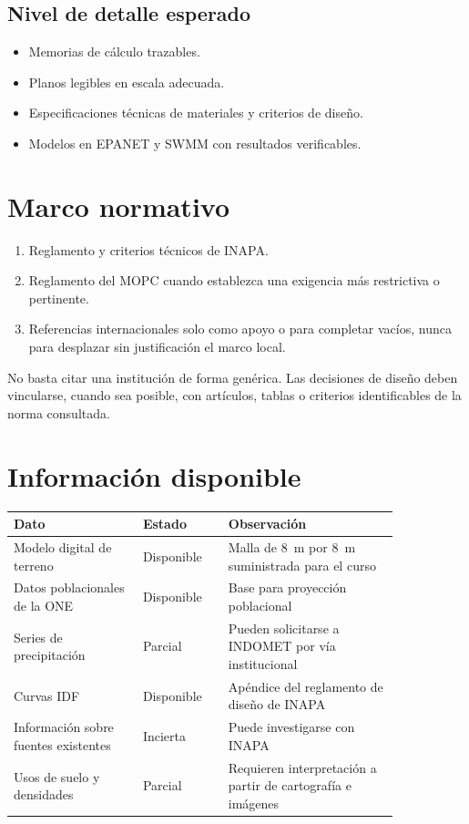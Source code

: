 \documentclass[11pt]{scrartcl}
\begin{document}
\subsection{Nivel de detalle esperado}
\begin{itemize}
  \item Memorias de cálculo trazables.
  \item Planos legibles en escala adecuada.
  \item Especificaciones técnicas de materiales y criterios de diseño.
  \item Modelos en EPANET y SWMM con resultados verificables.
\end{itemize}

\section{Marco normativo}
\begin{enumerate}
  \item Reglamento y criterios técnicos de INAPA.
  \item Reglamento del MOPC cuando establezca una exigencia más
    restrictiva o pertinente.
  \item Referencias internacionales solo como apoyo o para completar
    vacíos, nunca para desplazar sin justificación el marco local.
\end{enumerate}

\begin{icvwarning}[Atención]
No basta citar una institución de forma genérica. Las decisiones de
diseño deben vincularse, cuando sea posible, con artículos, tablas o
criterios identificables de la norma consultada.
\end{icvwarning}

\section{Información disponible}
\begin{center}
\begin{tabular}{p{0.29\linewidth} p{0.18\linewidth} p{0.37\linewidth}}
  \toprule
  \textbf{Dato} & \textbf{Estado} & \textbf{Observación} \\
  \midrule
  Modelo digital de terreno & Disponible & Malla de \qty{8}{\meter}
    por \qty{8}{\meter} suministrada para el curso \\
  Datos poblacionales de la ONE & Disponible & Base para proyección
    poblacional \\
  Series de precipitación & Parcial & Pueden solicitarse a INDOMET
    por vía institucional \\
  Curvas IDF & Disponible & Apéndice del reglamento de diseño de
    INAPA \\
  Información sobre fuentes existentes & Incierta & Puede
    investigarse con INAPA \\
  Usos de suelo y densidades & Parcial & Requieren interpretación a
    partir de cartografía e imágenes \\
  \bottomrule
\end{tabular}
\end{center}
\end{document}

